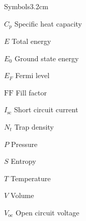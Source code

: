 \begin{mclistof}{Symbols}{3.2cm}
\vspace{\frontmatterbaselineskip}

\item[$C_p$] Specific heat capacity
\item[$E$] Total energy
\item[$E_0$] Ground state energy
\item[$E_F$] Fermi level
\item[$\textrm{FF}$] Fill factor
\item[$I_\textrm{sc}$] Short circuit current
\item[$N_t$] Trap density
\item[$P$] Pressure
\item[$S$] Entropy
\item[$T$] Temperature
\item[$V$] Volume
\item[$V_\textrm{oc}$] Open circuit voltage


\end{mclistof} 
